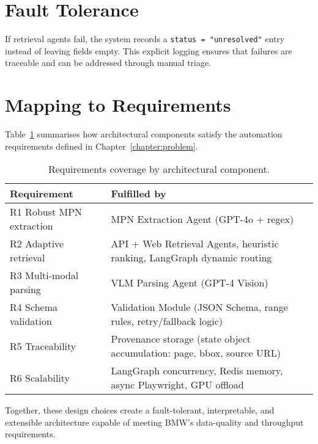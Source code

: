 \section{Fault Tolerance}
If retrieval agents fail, the system records a \verb|status = "unresolved"| entry instead of leaving fields empty. This explicit logging ensures that failures are traceable and can be addressed through manual triage.

\section{Mapping to Requirements}
Table~\ref{tab:reqmap} summarises how architectural components satisfy the automation requirements defined in Chapter~\ref{chapter:problem}.

\begin{table}[ht]
  \centering
  \caption{Requirements coverage by architectural component.}
  \label{tab:reqmap}
  \begin{tabular}{ll}
    \hline
    Requirement & Fulfilled by \\\hline
    R1 Robust MPN extraction & MPN Extraction Agent (GPT-4o + regex) \\
    R2 Adaptive retrieval    & API + Web Retrieval Agents, heuristic ranking, LangGraph dynamic routing \\
    R3 Multi-modal parsing   & VLM Parsing Agent (GPT-4 Vision) \\
    R4 Schema validation     & Validation Module (JSON Schema, range rules, retry/fallback logic) \\
    R5 Traceability          & Provenance storage (state object accumulation: page, bbox, source URL) \\
    R6 Scalability           & LangGraph concurrency, Redis memory, async Playwright, GPU offload \\\hline
  \end{tabular}
\end{table}

Together, these design choices create a fault-tolerant, interpretable, and extensible architecture capable of meeting BMW's data-quality and throughput requirements.
